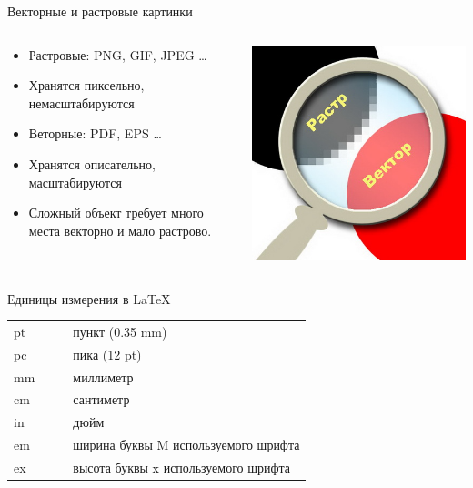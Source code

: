 \documentclass[aspectratio=169]{beamer} %
\begin{document}
\begin{frame}{Векторные и растровые картинки} 
\begin{columns}
\begin{column}{.55\linewidth}
\begin{itemize}
\item Растровые: PNG, GIF, JPEG \ldots
\item Хранятся пиксельно, немасштабируются
\item Веторные: PDF, EPS \ldots
\item Хранятся описательно, масштабируются
\item Сложный объект требует много места векторно и мало растрово.
\end{itemize}
\end{column}
\begin{column}{.42\linewidth}
\includegraphics[width=0.99\linewidth]{rv.jpg}
\end{column}
\end{columns}
\end{frame}


\begin{frame}[fragile]{ }
\begin{block}{Единицы измерения в \LaTeX}
\centering 
	\begin{tabulary}{\textwidth}{JccL}
		\toprule
			pt & & &пункт (0.35 mm) \\
			pc & & &пика  (12 pt)   \\
			mm & & &миллиметр       \\
			cm & & &сантиметр       \\
			in & & &дюйм            \\
			em & & &ширина буквы M используемого шрифта \\
			ex & & &высота буквы x используемого шрифта \\
		\bottomrule
	\end{tabulary}
\end{block}
\end{frame}
\end{document}
